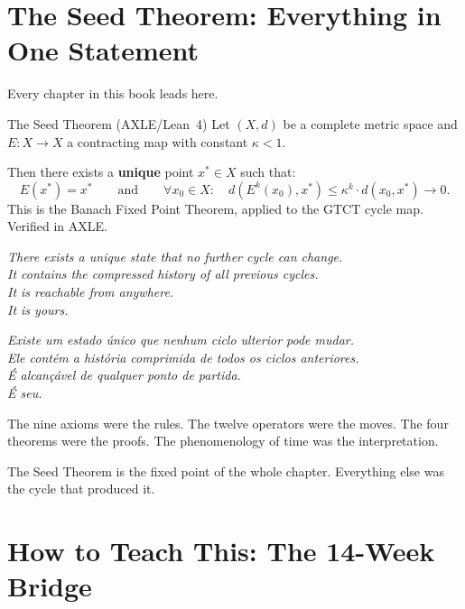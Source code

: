 \documentclass[12pt, openright]{book}
\theoremstyle{definition}
\theoremstyle{remark}
\begin{document}
\chapter{The Seed Theorem: Everything in One Statement}
\label{ch:seed}

Every chapter in this book leads here.

\begin{formalbox}{The Seed Theorem (AXLE/Lean~4)}
Let $(X, d)$ be a complete metric space and $E : X \to X$ a
contracting map with constant $\kappa < 1$.

Then there exists a \textbf{unique} point $x^* \in X$ such that:
\[
E(x^*) = x^*
\qquad \text{and} \qquad
\forall x_0 \in X: \quad d(E^k(x_0), x^*) \leq \kappa^k \cdot d(x_0, x^*) \to 0.
\]
This is the Banach Fixed Point Theorem, applied to the GTCT
cycle map. Verified in AXLE.
\end{formalbox}

\medskip

\begin{center}
\large\color{beastblue}
\textit{There exists a unique state that no further cycle can change.}\\[0.5em]
\textit{It contains the compressed history of all previous cycles.}\\[0.5em]
\textit{It is reachable from anywhere.}\\[0.5em]
\textit{It is yours.}
\end{center}

\medskip

\begin{center}
\normalsize\color{gray}\itshape
Existe um estado único que nenhum ciclo ulterior pode mudar.\\
Ele contém a história comprimida de todos os ciclos anteriores.\\
É alcançável de qualquer ponto de partida.\\
É seu.
\end{center}

\medskip

The nine axioms were the rules.
The twelve operators were the moves.
The four theorems were the proofs.
The phenomenology of time was the interpretation.

The Seed Theorem is the fixed point of the whole chapter.
Everything else was the cycle that produced it.

\chapter{How to Teach This: The 14-Week Bridge}
\label{ch:teach}
\end{document}
